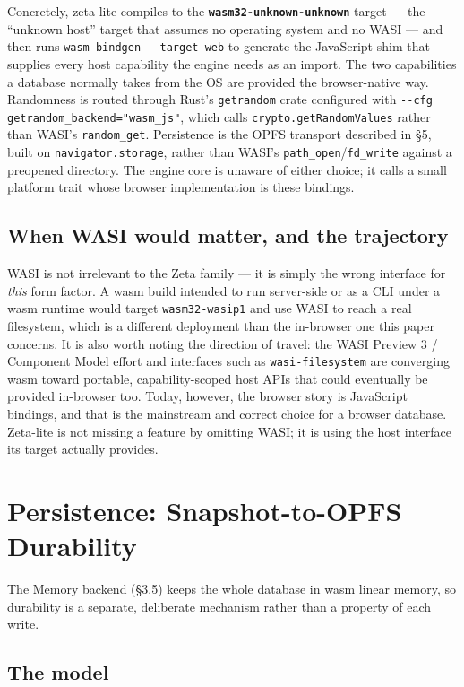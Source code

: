 \documentclass[11pt]{article}
\begin{document}
Concretely, zeta-lite compiles to the \textbf{\texttt{wasm32-unknown-unknown}}
target --- the ``unknown host'' target that assumes no operating system and no WASI
--- and then runs \texttt{wasm-bindgen -{}-target web} to generate the JavaScript
shim that supplies every host capability the engine needs as an import. The two
capabilities a database normally takes from the OS are provided the browser-native
way. Randomness is routed through Rust's \texttt{getrandom} crate configured with
\texttt{-{}-cfg getrandom\_backend="wasm\_js"}, which calls
\texttt{crypto.getRandomValues} rather than WASI's \texttt{random\_get}. Persistence
is the OPFS transport described in \S5, built on \texttt{navigator.storage}, rather
than WASI's \texttt{path\_open}/\texttt{fd\_write} against a preopened directory. The
engine core is unaware of either choice; it calls a small platform trait whose
browser implementation is these bindings.

\subsection{When WASI would matter, and the trajectory}

WASI is not irrelevant to the Zeta family --- it is simply the wrong interface for
\emph{this} form factor. A wasm build intended to run server-side or as a CLI under
a wasm runtime would target \texttt{wasm32-wasip1} and use WASI to reach a real
filesystem, which is a different deployment than the in-browser one this paper
concerns. It is also worth noting the direction of travel: the WASI Preview 3 /
Component Model effort and interfaces such as \texttt{wasi-filesystem} are
converging wasm toward portable, capability-scoped host APIs that could eventually
be provided in-browser too. Today, however, the browser story is JavaScript
bindings, and that is the mainstream and correct choice for a browser database.
Zeta-lite is not missing a feature by omitting WASI; it is using the host interface
its target actually provides.

\section{Persistence: Snapshot-to-OPFS Durability}

The Memory backend (\S3.5) keeps the whole database in wasm linear memory, so
durability is a separate, deliberate mechanism rather than a property of each write.

\subsection{The model}
\end{document}
